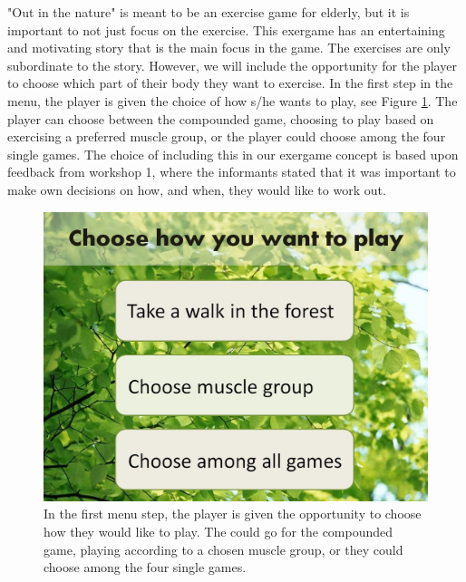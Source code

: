 "Out in the nature" is meant to be an exercise game for elderly, but it is important to not just focus on the exercise. This exergame has an entertaining and motivating story that is the main focus in the game. The exercises are only subordinate to the story. However, we will include the opportunity for the player to choose which part of their body they want to exercise. In the first step in the menu, the player is given the choice of how s/he wants to play, see Figure \ref{fig:menuStart}. The player can choose between the compounded game, choosing to play based on exercising a preferred muscle group, or the player could choose among the four single games. The choice of including this in our exergame concept is based upon feedback from workshop 1, where the informants stated that it was important to make own decisions on how, and when, they would like to work out.                     

\begin{figure} [H]
\centering
\includegraphics[scale=0.45]{choosePlay.jpg}
\caption[The menu - start]{In the first menu step, the player is given the opportunity to choose how they would like to play. The could go for the compounded game, playing according to a chosen muscle group, or they could choose among the four single games.}
\label{fig:menuStart}
\end{figure} 

